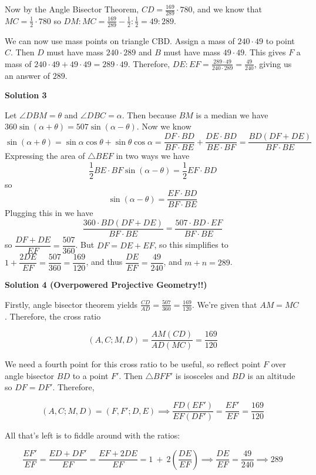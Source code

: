 \begin{enumerate}
 Now by the Angle Bisector Theorem, $CD=\frac{169}{289}\cdot 780$, and we know that $MC=\frac{1}{2}\cdot 780$ so $DM:MC=\frac{169}{289}-\frac{1}{2}:\frac{1}{2}=49:289$.

 We can now use mass points on triangle CBD. Assign a mass of $240\cdot 49$ to point $C$. Then $D$ must have mass $240\cdot 289$ and $B$ must have mass $49\cdot 49$. This gives $F$ a mass of $240\cdot 49+49\cdot 49=289\cdot 49$. Therefore, $DE:EF=\frac{289\cdot 49}{240\cdot 289}=\frac{49}{240}$, giving us an answer of $\boxed{289}.$




\textbf{Solution 3}

Let $\angle{DBM}=\theta$ and $\angle{DBC}=\alpha$. Then because $BM$ is a median we have $360\sin{(\alpha+\theta)}=507\sin{(\alpha-\theta)}$. Now we know 
 \[\sin{(\alpha+\theta)}=\sin{\alpha}\cos{\theta}+\sin{\theta}\cos{\alpha}=\dfrac{DF\cdot BD}{BF\cdot BE}+\dfrac{DE\cdot BD}{BE\cdot BF}=\dfrac{BD(DF+DE)}{BF\cdot BE}\] Expressing the area of $\triangle{BEF}$ in two ways we have 
 \[\dfrac{1}{2}BE\cdot BF\sin{(\alpha-\theta)}=\dfrac{1}{2}EF\cdot BD\] so 
 \[\sin{(\alpha-\theta)}=\dfrac{EF\cdot BD}{BF\cdot BE}\] Plugging this in we have 
 \[\dfrac{360\cdot BD(DF+DE)}{BF\cdot BE}=\dfrac{507\cdot BD\cdot EF}{BF\cdot BE}\] so $\dfrac{DF+DE}{EF}=\dfrac{507}{360}$. But $DF=DE+EF$, so this simplifies to $1+\dfrac{2DE}{EF}=\dfrac{507}{360}=\dfrac{169}{120}$, and thus $\dfrac{DE}{EF}=\dfrac{49}{240}$, and $m+n=\boxed{289}$.

 



\textbf{Solution 4 (Overpowered Projective Geometry!!)}

Firstly, angle bisector theorem yields $\frac{CD}{AD} = \frac{507}{360} = \frac{169}{120}$. We're given that $AM=MC$. Therefore, the cross ratio

 
 \[(A,C;M,D) = \frac{AM(CD)}{AD(MC)} = \frac{169}{120}\]

 We need a fourth point for this cross ratio to be useful, so reflect point $F$ over angle bisector $BD$ to a point $F'$. Then $\triangle BFF'$ is isosceles and $BD$ is an altitude so $DF = DF'$. Therefore, 

 
 \[(A,C;M,D) = (F,F';D,E) \implies \frac{FD(EF')}{EF(DF')} = \frac{EF'}{EF} = \frac{169}{120}\]

 All that's left is to fiddle around with the ratios:

 
 \[\frac{EF'}{EF} = \frac{ED+DF'}{EF} = \frac{EF+2DE}{EF} = 1\ +\ 2\left(\frac{DE}{EF}\right) \implies \frac{DE}{EF} = \frac{49}{240} \implies \boxed{289}\]





\end{enumerate}

